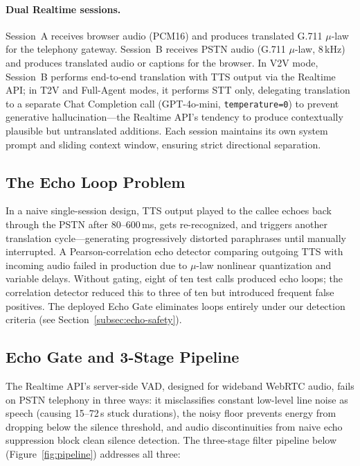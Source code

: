 \documentclass[11pt]{article}
\begin{document}
\paragraph{Dual Realtime sessions.}
Session~A receives browser audio (PCM16) and produces translated G.711 $\mu$-law for the telephony gateway. Session~B receives PSTN audio (G.711 $\mu$-law, 8\,kHz) and produces translated audio or captions for the browser. In V2V mode, Session~B performs end-to-end translation with TTS output via the Realtime API; in T2V and Full-Agent modes, it performs STT only, delegating translation to a separate Chat Completion call (GPT-4o-mini, \texttt{temperature=0}) to prevent generative hallucination---the Realtime API's tendency to produce contextually plausible but untranslated additions. Each session maintains its own system prompt and sliding context window, ensuring strict directional separation.

\subsection{The Echo Loop Problem}

In a naive single-session design, TTS output played to the callee echoes back through the PSTN after 80--600\,ms, gets re-recognized, and triggers another translation cycle---generating progressively distorted paraphrases until manually interrupted. A Pearson-correlation echo detector comparing outgoing TTS with incoming audio failed in production due to $\mu$-law nonlinear quantization and variable delays. Without gating, eight of ten test calls produced echo loops; the correlation detector reduced this to three of ten but introduced frequent false positives. The deployed Echo Gate eliminates loops entirely under our detection criteria (see Section~\ref{subsec:echo-safety}).

\subsection{Echo Gate and 3-Stage Pipeline}

The Realtime API's server-side VAD, designed for wideband WebRTC audio, fails on PSTN telephony in three ways: it misclassifies constant low-level line noise as speech (causing 15--72\,s stuck durations), the noisy floor prevents energy from dropping below the silence threshold, and audio discontinuities from naive echo suppression block clean silence detection. The three-stage filter pipeline below (Figure~\ref{fig:pipeline}) addresses all three:
\end{document}
